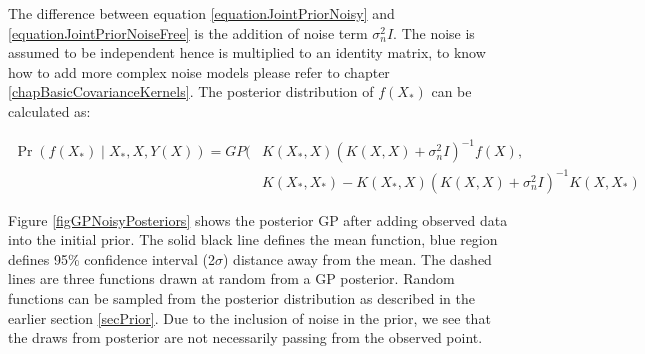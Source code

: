 The difference between equation \ref{equationJointPriorNoisy} and \ref{equationJointPriorNoiseFree} is the addition of noise term \(\sigma^{2}_{n}I\). The noise is assumed to be independent hence is multiplied to an identity matrix, to know how to add more complex noise models please refer to chapter \ref{chapBasicCovarianceKernels}. The posterior distribution of \(f(X_{*})\) can be calculated as:

  \begin{equation}\label{eqNoisyPredictiveGP}
  \begin{aligned}
      \Pr(f(X_{*}) \mid X_{*}, X, Y(X)) = GP(  & K(X_{*}, X)( K(X, X) + \sigma^{2}_{n}I)^{-1}f(X),   \\ 
                                & K(X_{*}, X_{*}) - K(X_{*}, X)( K(X, X) + \sigma^{2}_{n}I)^{-1} K(X, X_{*}) 
  \end{aligned}
  \end{equation}

Figure \ref{figGPNoisyPosteriors} shows the posterior GP after adding observed data into the initial prior. The solid black line defines the mean function, blue region defines 95\% confidence interval (2\(\sigma\)) distance away from the mean. The dashed lines are three functions drawn at random from a GP posterior. Random functions can be sampled from the posterior distribution as described in the earlier section \ref{secPrior}.  Due to the inclusion of noise in the prior, we see that the draws from posterior are not necessarily passing from the observed point.


